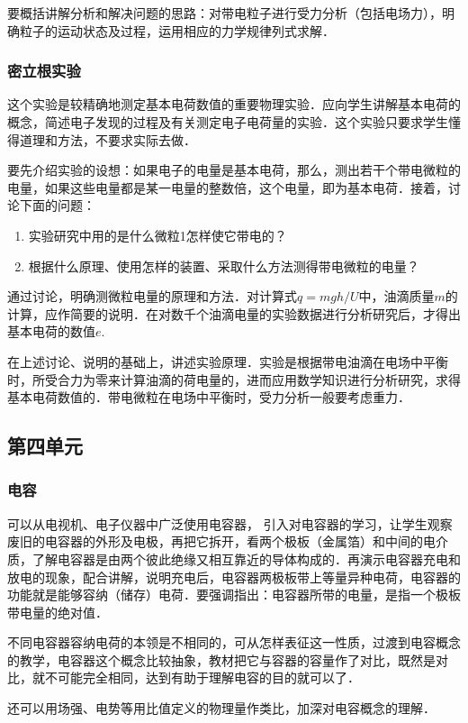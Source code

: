 要概括讲解分析和解决问题的思路：对带电粒子进行受力分析（包括电场力），明确粒子的运动状态及过程，运用相应的力学规律列式求解．

\subsubsection{密立根实验}

这个实验是较精确地测定基本电荷数值的重要物理实验．应向学生讲解基本电荷的概念，简述电子发现的过程及有关测定电子电荷量的实验．这个实验只要求学生懂得道理和方法，不要求实际去做．

要先介绍实验的设想：如果电子的电量是基本电荷，那么，测出若干个带电微粒的电量，如果这些电量都是某一电量的整数倍，这个电量，即为基本电荷．接着，讨论下面的问题：
\begin{enumerate}
\item 实验研究中用的是什么微粒1怎样使它带电的？
\item 根据什么原理、使用怎样的装置、采取什么方法测得带电微粒的电量？
\end{enumerate}
通过讨论，明确测微粒电量的原理和方法．对计算式$q=mgh/U$中，油滴质量$m$的计算，应作简要的说明．在对数千个油滴电量的实验数据进行分析研究后，才得出基本电荷的数值$e$.

在上述讨论、说明的基础上，讲述实验原理．实验是根据带电油滴在电场中平衡时，所受合力为零来计算油滴的荷电量的，进而应用数学知识进行分析研究，求得基本电荷数值的．带电微粒在电场中平衡时，受力分析一般要考虑重力．

\subsection{第四单元}
\subsubsection{电容}

可以从电视机、电子仪器中广泛使用电容器，
引入对电容器的学习，让学生观察废旧的电容器的外形及电极，再把它拆开，看两个极板（金属箔）和中间的电介质，了解电容器是由两个彼此绝缘又相互靠近的导体构成的．再演示电容器充电和放电的现象，配合讲解，说明充电后，电容器两极板带上等量异种电荷，电容器的功能就是能够容纳（储存）电荷．要强调指出：电容器所带的电量，是指一个极板带电量的绝对值．

不同电容器容纳电荷的本领是不相同的，可从怎样表征这一性质，过渡到电容概念的教学，电容器这个概念比较抽象，教材把它与容器的容量作了对比，既然是对比，就不可能完全相同，达到有助于理解电容的目的就可以了．

还可以用场强、电势等用比值定义的物理量作类比，加深对电容概念的理解．

